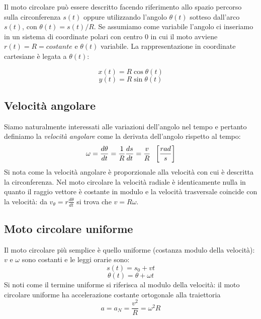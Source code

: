 \documentclass[class=book, crop=false, oneside, 12pt]{standalone}
\begin{document}
Il moto circolare può essere descritto facendo riferimento allo spazio percorso sulla circonferenza \(s(t)\) oppure
utilizzando l'angolo \(\theta (t)\) sotteso dall'arco \(s(t)\), con \(\theta(t) = s(t)/R\).
Se assumiamo come variabile l'angolo ci inseriamo in un sistema di coordinate polari con centro \(0\) in cui il moto avviene \(r(t) = R = costante\) e \(\theta(t)\) variabile.
La rappresentazione in coordinate cartesiane \`e legata a $\theta(t)$:
\begin{multicols}{2}
  \noindent
  $$x(t)=R\cos\theta(t)$$
  $$y(t)=R\sin\theta(t)$$
\end{multicols}
  \subsection{Velocit\`a angolare}
  Siamo naturalmente interessati alle variazioni dell'angolo nel tempo e pertanto definiamo la \emph{velocità angolare} come la derivata dell'angolo rispetto al tempo:
  \begin{equation}
   \omega = \frac{d \theta}{dt} = \frac{1}{R} \frac {ds} {dt} = \frac{v}{R} \hspace{0.2cm} \left[\frac{rad}{s}\right]
  \end{equation}
	Si nota come la velocit\`a angolare \`e proporzionale alla velocit\`a con cui \`e descritta la circonferenza.
	Nel moto circolare la velocit\`a radiale \`e identicamente nulla in quanto il raggio vettore \`e costante in modulo e la velocit\`a trasversale coincide con la velocit\`a: da $v_\theta=r\frac{d\theta}{dt}$ si trova che $v=R\omega$.
  \subsection{Moto circolare uniforme}
  Il moto circolare più semplice è quello uniforme (costanza modulo della velocità): \(v\) e \(\omega\) sono costanti e le leggi orarie sono:
  \begin{equation}
    s(t) = s_0 + vt
  \end{equation}
  \begin{equation}
    \theta(t) = \theta + \omega t
  \end{equation}
  Si noti come il termine uniforme si riferisca al modulo della velocit\`a: il moto circolare uniforme ha accelerazione costante ortogonale alla traiettoria
  \begin{equation}
   a = a_N = \frac{v^2}{R} = \omega^2 R
  \end{equation}
\end{document}

